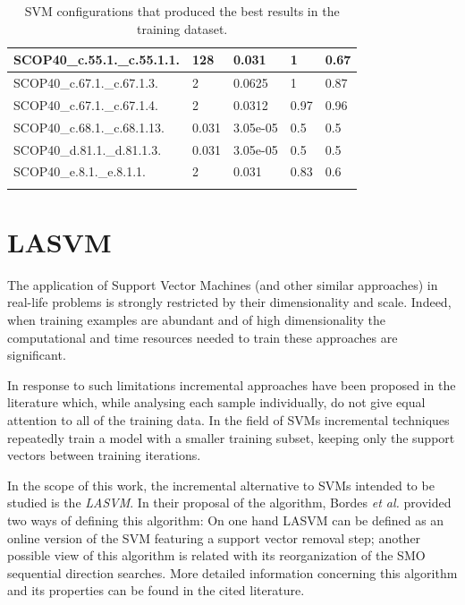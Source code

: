 \documentclass[11pt]{article}
\begin{document}
\begin{longtable}{|p{}|p{}|p{}|p{}|p{}|}
	SCOP40\_c.55.1.\_c.55.1.1.    & 128   & 0.031    & 1      & 0.67  \\ \hline
	
	SCOP40\_c.67.1.\_c.67.1.3.    & 2     & 0.0625   & 1      & 0.87  \\ \hline
	
	SCOP40\_c.67.1.\_c.67.1.4.    & 2     & 0.0312   & 0.97   & 0.96  \\ \hline
	
	SCOP40\_c.68.1.\_c.68.1.13.   & 0.031 & 3.05e-05 & 0.5    & 0.5   \\ \hline
	
	SCOP40\_d.81.1.\_d.81.1.3.    & 0.031 & 3.05e-05 & 0.5    & 0.5   \\ \hline
	
	SCOP40\_e.8.1.\_e.8.1.1.      & 2     & 0.031    & 0.83   & 0.6   \\ \hline
	\caption{SVM configurations that produced the best results in the training dataset.}
	\label{svm_results}
\end{longtable}

\section{LASVM}
\label{lasvm}

The application of Support Vector Machines (and other similar approaches) in real-life problems is strongly restricted by their dimensionality and scale. Indeed, when training examples are abundant and of high dimensionality the computational and time resources needed to train these approaches are significant.

In response to such limitations incremental approaches have been proposed in the literature which, while analysing each sample individually, do not give equal attention to all of the training data. In the field of SVMs incremental techniques repeatedly train a model with a smaller training subset, keeping only the support vectors between training iterations.

In the scope of this work, the incremental alternative to SVMs intended to be studied is the \emph{LASVM}. In their proposal of the algorithm, Bordes \emph{et al.} \cite{bordes-ertekin-weston-bottou-2005} provided two ways of defining this algorithm: On one hand LASVM can be defined as an online version of the SVM featuring a support vector removal step; another possible view of this algorithm is related with its reorganization of the SMO sequential direction searches. More detailed information concerning this algorithm and its properties can be found in the cited literature.
\end{document}
